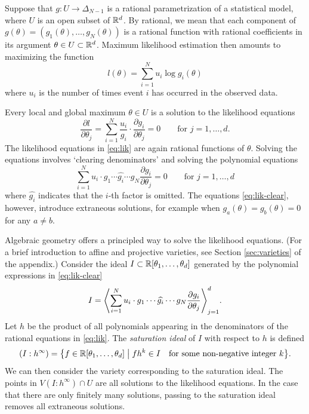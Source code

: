 \documentclass[cclicense]{hmcthesis}
\numberwithin{equation}{section}
\begin{document}
    Suppose that $g: U \to \Delta_{N-1}$ is a rational parametrization of a
    statistical model, where $U$ is an open subset of $\R^d$.  By rational, we
    mean that each component of $g(\theta) = (g_1(\theta), \ldots, g_N(\theta))$
    is a rational function with rational coefficients in its argument $\theta
    \in U \subset \R^d$.  Maximum likelihood estimation then amounts to
    maximizing the function
    \[
        l(\theta) = \sum_{i=1}^N u_i \log g_i(\theta)
    \] 
    where $u_i$ is the number of times event $i$ has occurred in the observed
    data.

    Every local and global maximum $\theta \in U$ is a solution to the
    likelihood equations
    \begin{equation}\label{eq:lik}
        \frac{\partial l}{\partial\theta_j}
        =
        \sum_{i=1}^N 
        \frac{u_i}{g_i} 
        \cdot
        \frac{\partial g_i}{\partial \theta_j}
        = 0
        \qquad
        \text{for $j = 1,\ldots,d$}.
    \end{equation}
    The likelihood equations in \eqref{eq:lik} are again rational functions of
    $\theta$.  Solving the equations involves `clearing denominators' and
    solving the polynomial equations
    \begin{equation}\label{eq:lik-clear}
        \sum_{i=1}^N 
        u_i \cdot g_1 \cdots \widehat{g_i} \cdots g_N
        \frac{\partial g_i}{\partial \theta_j}
        = 0
        \qquad
        \text{for $j = 1, \ldots, d$}
    \end{equation}
    where $\widehat{g_i}$ indicates that the $i$-th factor is omitted.  The
    equations \eqref{eq:lik-clear}, however, introduce extraneous solutions, for
    example when $g_a(\theta) = g_b(\theta) = 0$ for any $a \ne b$.

    Algebraic geometry offers a principled way to solve the likelihood
    equations.  (For a brief introduction to affine and projective varieties, see
    Section \ref{sec:varieties} of the appendix.)  Consider the ideal $I \subset \R[\theta_1,
    \ldots, \theta_d]$ generated by the polynomial expressions in \eqref{eq:lik-clear}
    \[
        I = \adel[\Bigg]{
            \sum_{i=1}^N u_i \cdot g_1 \cdots \widehat{g_i} \cdots g_N
            \frac{\partial g_i}{\partial \theta_j}
        }_{j=1}^d
        .
    \]
    Let $h$ be the product of all polynomials appearing in the denominators of
    the rational equations in \eqref{eq:lik}.  The \emph{saturation ideal} of
    $I$ with respect to $h$ is defined
    \[
        (I : h^\infty) = \cdel[\big]{
            f \in \R[\theta_1, \ldots, \theta_d]
            \;\big\vert\;
            fh^k \in I
            \quad
            \text{for some non-negative integer $k$}
        }.
    \]
    We can then consider the variety corresponding to the saturation ideal.  The
    points in $V(I : h^\infty) \cap U$ are all solutions to the likelihood
    equations.  In the case that there are only finitely many solutions, passing
    to the saturation ideal removes all extraneous solutions.
\end{document}

